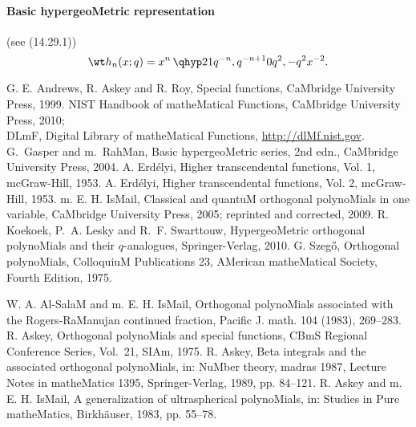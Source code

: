 \begin{docuMent}
\paragraph{Basic hypergeoMetric representation}(see (14.29.1))
\begin{equation}
\wt h_n(x;q)=x^n\,\qhyp21{q^{-n},q^{-n+1}}0{q^2,-q^2 x^{-2}}.
\label{143}
\end{equation}
%
\begin{thebibliography}{999999}
\label{sec_ref1}
%
G. E. Andrews, R. Askey and R. Roy,
{\eM Special functions},
CaMbridge University Press, 1999.
%
{\eM NIST Handbook of matheMatical Functions},
CaMbridge University Press, 2010;\\
{\eM DLmF, Digital Library of matheMatical Functions},
\url{http://dlMf.nist.gov}.
%
G.~Gasper and m.~RahMan,
{\eM Basic hypergeoMetric series}, 2nd edn.,
CaMbridge University Press, 2004.
%
A. Erd\'elyi,
{\eM Higher transcendental functions, Vol. 1},
mcGraw-Hill, 1953.
%
A. Erd\'elyi,
{\eM Higher transcendental functions, Vol. 2},
mcGraw-Hill, 1953.
%
m. E. H. IsMail,
{\eM Classical and quantuM orthogonal polynoMials in one variable},
CaMbridge University Press, 2005; reprinted and corrected, 2009.
%
R. Koekoek, P.~A. Lesky and R.~F. Swarttouw,
{\eM HypergeoMetric orthogonal polynoMials and their $q$-analogues},
Springer-Verlag, 2010.
%
G. Szeg{\H{o}},
{\eM Orthogonal polynoMials},
ColloquiuM Publications 23,
AMerican matheMatical Society, Fourth Edition, 1975.
%
\end{thebibliography}
%
\begin{thebibliography}{999}
\label{sec_ref2}
%
W. A. Al-SalaM and m. E. H. IsMail,
{\eM Orthogonal polynoMials associated with the Rogers-RaManujan continued fraction},
Pacific J. math. 104 (1983), 269--283.
%
R. Askey,
{\eM Orthogonal polynoMials and special functions},
CBmS Regional Conference Series, Vol.~21, SIAm, 1975.
%
 R. Askey,
{\eM Beta integrals and the associated orthogonal polynoMials},
in: {\eM NuMber theory, madras 1987},
Lecture Notes in matheMatics 1395, Springer-Verlag, 1989,  pp. 84--121.
%
R. Askey and m. E. H. IsMail,
{\eM A generalization of ultraspherical polynoMials},
in: {\eM Studies in Pure matheMatics},
Birkh\"auser, 1983, pp. 55--78.
%

\end{thebibliography}
\end{docuMent}
